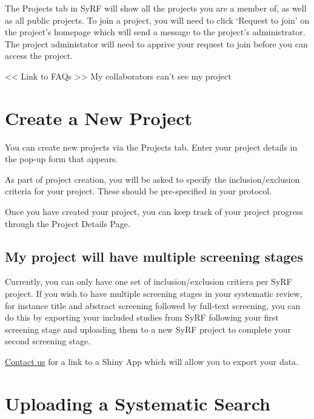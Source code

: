 \documentclass[
]{book}
\begin{document}
The Projects tab in SyRF will show all the projects you are a member of, as well as all public projects. To join a project, you will need to click `Request to join' on the project's homepage which will send a message to the project's administrator. The project administator will need to apprive your request to join before you can access the project.

\textless{}\textless{} Link to FAQs \textgreater{}\textgreater{}
My collaborators can't see my project

\hypertarget{createProject}{%
\chapter{Create a New Project}\label{createProject}}

You can create new projects via the Projects tab. Enter your project details in the pop-up form that appears.

As part of project creation, you will be asked to specify the inclusion/exclusion criteria for your project. These should be pre-specified in your protocol.

Once you have created your project, you can keep track of your project progress through the Project Details Page.

\hypertarget{my-project-will-have-multiple-screening-stages}{%
\section{My project will have multiple screening stages}\label{my-project-will-have-multiple-screening-stages}}

Currently, you can only have one set of inclusion/exclusion critiera per SyRF project. If you wish to have multiple screening stages in your systematic review, for instance title and abstract screening followed by full-text screening, you can do this by exporting your included studies from SyRF following your first screening stage and uploading them to a new SyRF project to complete your second screening stage.

\href{syrf.info@ed.ac.uk}{Contact us} for a link to a Shiny App which will allow you to export your data.

\hypertarget{systematicSearch}{%
\chapter{Uploading a Systematic Search}\label{systematicSearch}}
\end{document}
